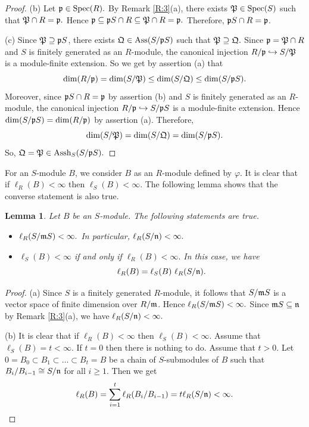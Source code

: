 \documentclass[a4papersize]{article}
\newtheorem{lemma}[theorem]{Lemma}
\DeclareMathOperator{\Ass}{Ass}
\DeclareMathOperator{\Assh}{Assh}
\DeclareMathOperator{\Spec}{Spec}
\begin{document}
{\begin{proof}
(b) Let $\frak p\in\Spec(R).$ By  Remark \ref{R:3}(a),  there exists $\frak P\in\Spec(S)$ such that $\frak P\cap R=\frak p.$ Hence $\frak p\subseteq \frak pS\cap R\subseteq \frak P\cap R=\frak p.$ Therefore, $\frak pS\cap R=\frak p$.
		
(c) Since $\frak P\supseteq \frak pS$, there exists $\frak Q\in\Ass(S/\frak pS)$ such that $\frak P\supseteq \frak Q.$ Since $\frak p=\frak P\cap R$ and $S$ is finitely generated as an $R$-module, the canonical injection $R/\frak p\hookrightarrow S/\frak P$ is a module-finite extension. So we get by assertion (a) that 
$$\dim(R/\frak p)=\dim(S/\frak P)\leq \dim(S/\frak Q)\leq \dim(S/\frak pS).$$ 
Moreover, since $\frak pS\cap R=\frak p$  by assertion (b) and $S$  is finitely generated as an $R$-module, the canonical injection $R/\frak p\hookrightarrow S/\frak pS$ is a module-finite  extension. Hence $\dim(S/\frak pS)=\dim(R/\frak p)$ by assertion (a). Therefore, $$\dim(S/\frak P)= \dim(S/\frak Q)= \dim(S/\frak pS).$$ So, $\frak Q=\frak P\in\Assh_S(S/\frak pS).$
\end{proof}

For an  $S$-module $B$, we consider $B$ as an $R$-module defined by $\varphi$.   It is clear that if $\ell_R(B)<\infty$ then $\ell_S(B)<\infty.$ The following lemma shows that the converse statement is also true.
		
\begin{lemma}\label{L:4} Let $B$ be an $S$-module. The following statements are true.
\begin{itemize}
\item [{\rm (a)}] $\ell_R(S/\frak mS)<\infty.$ In particular, $\ell_R(S/\frak n)<\infty.$
\item [{\rm (b)}] $\ell_S(B)<\infty$   if and only if $\ell_R(B)<\infty.$ In this case, we have  $$\ell_R(B)=\ell_S(B)~\ell_R(S/\frak n).$$ 
\end{itemize}
\end{lemma}
\begin{proof} (a) Since $S$ is a finitely generated $R$-module, it follows that $S/\frak mS$ is a vector space of finite dimension over  $R/\frak m$. Hence $\ell_R(S/\frak mS)<\infty.$   Since  $\frak mS\subseteq \frak n$ by Remark \ref{R:3}(a), we have $\ell_R(S/\frak n)<\infty.$ 
		
(b) It is clear that if $\ell_R(B)<\infty$ then $\ell_S(B)<\infty$. Assume that $\ell_S(B)=t<\infty.$ If $t=0$ then there is nothing to do. Assume that    $t>0$. Let  $0=B_0\subset B_1\subset \ldots\subset B_t=B$ be a chain of $S$-submodules of $B$ such that $B_i/B_{i-1}\cong S/\frak n$ for all $i\geq 1.$ Then we get $$\ell_R(B)=\sum_{i=1}^{t}\ell_R(B_i/B_{i-1})=t\ell_R(S/\frak n)<\infty.$$	
\end{proof}

}
\end{document}
